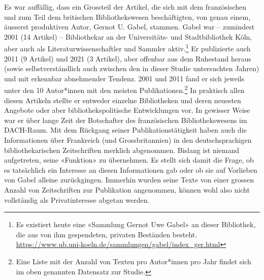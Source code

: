 \documentclass[a4paper,
fontsize=11pt,
oneside,
numbers=noperiodatend,
parskip=half-,
bibliography=totoc,
final
]{scrartcl}
\begin{document}
Es war auffällig, dass ein Grossteil der Artikel, die sich mit dem
französischen und zum Teil dem britischen Bibliothekswesen
beschäftigten, von genau einem, äusserst produktiven Autor, Gernot U.
Gabel, stammen. Gabel war -- zumindest 2001 (14 Artikel) -- Bibliothekar
an der Universitäts- und Stadtbibliothek Köln, aber auch als
Literaturwissenschaftler und Sammler aktiv.\footnote{Es existiert heute
  eine «Sammlung Gernot Uwe Gabel» an dieser Bibliothek, die aus von ihm
  gespendeten, privaten Beständen besteht.
  \url{https://www.ub.uni-koeln.de/sammlungen/gabel/index_ger.html}} Er
publizierte auch 2011 (9 Artikel) und 2021 (3 Artikel), aber offenbar
aus dem Ruhestand heraus (sowie selbstverständlich auch zwischen den in
dieser Studie untersuchten Jahren) und mit erkennbar abnehmender
Tendenz. 2001 und 2011 fand er sich jeweils unter den 10 Autor*innen mit
den meisten Publikationen.\footnote{Eine Liste mit der Anzahl von Texten
  pro Autor*innen pro Jahr findet sich im oben genannten Datensatz zur
  Studie.} In praktisch allen diesen Artikeln stellte er entweder
einzelne Bibliotheken und deren neuesten Angebote oder aber
bibliothekspolitische Entwicklungen vor. In gewisser Weise war er über
lange Zeit der Botschafter des französischen Bibliothekswesens im
DACH-Raum. Mit dem Rückgang seiner Publikationstätigkeit haben auch die
Informationen über Frankreich (und Grossbritannien) in den
deutschsprachigen bibliothekarischen Zeitschriften merklich abgenommen.
Bislang ist niemand aufgetreten, seine «Funktion» zu übernehmen. Es
stellt sich damit die Frage, ob es tatsächlich ein Interesse an diesen
Informationen gab oder ob sie auf Vorlieben von Gabel alleine
zurückgingen. Immerhin wurden seine Texte von einer grossen Anzahl von
Zeitschriften zur Publikation angenommen, können wohl also nicht
vollständig als Privatinteresse abgetan werden.
\end{document}
